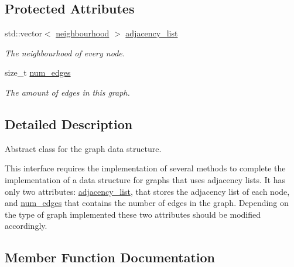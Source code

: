 \subsection*{Protected Attributes}
\begin{DoxyCompactItemize}
\item 
\mbox{\label{classlgraph_1_1xxgraph_a31cf82d0b20be05290be259dc97a51ec}} 
std\+::vector$<$ \hyperlink{namespacelgraph_a052e7766c13f3a43cec0aec8173fdede}{neighbourhood} $>$ \hyperlink{classlgraph_1_1xxgraph_a31cf82d0b20be05290be259dc97a51ec}{adjacency\+\_\+list}
\begin{DoxyCompactList}\small\item\em The neighbourhood of every node. \end{DoxyCompactList}\item 
\mbox{\label{classlgraph_1_1xxgraph_a6765a9a3be42f6e0f824635c593b35d7}} 
size\+\_\+t \hyperlink{classlgraph_1_1xxgraph_a6765a9a3be42f6e0f824635c593b35d7}{num\+\_\+edges}
\begin{DoxyCompactList}\small\item\em The amount of edges in this graph. \end{DoxyCompactList}\end{DoxyCompactItemize}


\subsection{Detailed Description}
Abstract class for the graph data structure. 

This interface requires the implementation of several methods to complete the implementation of a data structure for graphs that uses adjacency lists. It has only two attributes\+: \hyperlink{classlgraph_1_1xxgraph_a31cf82d0b20be05290be259dc97a51ec}{adjacency\+\_\+list}, that stores the adjacency list of each node, and \hyperlink{classlgraph_1_1xxgraph_a6765a9a3be42f6e0f824635c593b35d7}{num\+\_\+edges} that contains the number of edges in the graph. Depending on the type of graph implemented these two attributes should be modified accordingly. 

\subsection{Member Function Documentation}
\mbox{\label{classlgraph_1_1xxgraph_a8dd24aa48d55dfceaa87e47c32ae914a}} 
